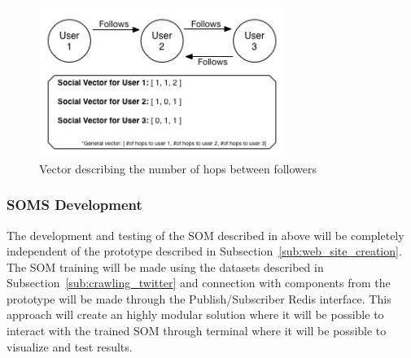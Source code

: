\begin{figure}[tb]
  \begin{center}
    \includegraphics[width=8cm]{images/11_hops_svm.jpg}
  \end{center}
  \caption{Vector describing the number of hops between followers}
  \label{fig:hops}
\end{figure}
\subsubsection{SOMS Development} %
\label{ssub:soms_development}
The development and testing of the SOM described in above will be completely independent of the prototype described in Subsection~\ref{sub:web_site_creation}. The SOM training will be made using the datasets described in Subsection~\ref{sub:crawling_twitter} and connection with components from the prototype will be made through the Publish/Subscriber Redis interface. This approach will create an highly modular solution where it will be possible to interact with the trained SOM through terminal where it will be possible to visualize and test results.

